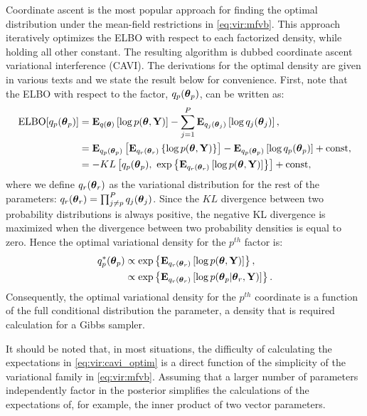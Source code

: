 \documentclass[]{article}
\newcommand{\V}[1]{{\bm{\mathbf{\MakeLowercase{#1}}}}} %
\def\E{{\bf E}}
\def\Y{{\bf Y}}
\def \vtheta{{\V{\theta}}}
\begin{document}
Coordinate ascent is the most popular approach for finding the optimal
distribution under the mean-field restrictions in \eqref{eq:vir:mfvb}. This
approach iteratively optimizes the ELBO with respect to each factorized density,
while holding all other constant. The resulting algorithm is dubbed coordinate
ascent variational interference (CAVI). The derivations for the optimal density
are given in various texts \cite{bishop2006pattern, vbreview, murphy2012} and we
state the result below for convenience. First, note that the ELBO with respect
to the factor, $q_p(\vtheta_p)$, can be written as:
\begin{align*}
\begin{split}
\text{ELBO}[q_p(\vtheta_p)] & = 
\E_{q(\vtheta)} \left[
\log p(\vtheta, \Y)
\right ] -
\sum_{j = 1}^P 	\E_{q_j(\vtheta_j)} \left[  \log q_j(\vtheta_j)	\right],
\\
& = 
\E_{q_p(\vtheta_p)} \left[ 
\E_{q_{r}(\vtheta_{r})} \left \{
\log p(\vtheta, \Y)
\right \}
\right ] -
\E_{q_p(\vtheta_p)} \left[ \log q_p(\vtheta_p) \right] + 
\text{const}, \\
& = - KL \left[
q_p(\vtheta_p), \ 
\exp \left\{ \E_{q_{r}(\vtheta_{r})} \left[
\log p(\vtheta, \Y)
\right] \right \}
\right] + \text{const},
\end{split}
\end{align*}
%
where we define $q_r(\vtheta_r)$ as the variational distribution for the rest of
the parameters: $q_{r}(\vtheta_r) = \prod_{j \neq p}^P q_{j}(\vtheta_j)$. Since
the $KL$ divergence between two probability distributions is always positive,
the negative KL divergence is maximized when the divergence between two
probability densities is equal to zero.  Hence the optimal variational density
for the $p^{th}$ factor is: 
\begin{align}
\label{eq:vir:cavi_optim}
q^*_p(\vtheta_p) & \propto \exp \left\{ \E_{q_{r}(\vtheta_{r})} \left[
\log p(\vtheta, \Y)
\right] \right \}, \\
& \propto \exp \left\{ \E_{q_{r}(\vtheta_{r})} \left[
\log p(\vtheta_p | \vtheta_r, \Y)
\right] \right \}.
\end{align}
%
Consequently, the optimal variational density for the $p^{th}$ coordinate is a
function of the full conditional distribution the parameter, a density that is
required calculation for a Gibbs sampler. 

It should be noted that, in most situations, the difficulty of calculating the
expectations in \eqref{eq:vir:cavi_optim} is a direct function of the simplicity
of the variational family in \eqref{eq:vir:mfvb}. Assuming that a larger number
of parameters independently factor in the posterior simplifies the calculations
of the expectations of, for example, the inner product of two vector parameters.
\end{document}
